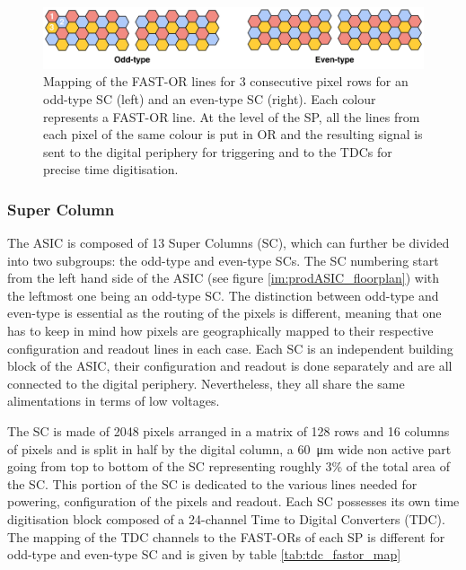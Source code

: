 			\begin{figure}[h]
				\centering
				\includegraphics[width=1.0\textwidth]{files/FastOr_map}
				\caption{Mapping of the FAST-OR lines for 3 consecutive pixel rows for an odd-type SC (left) and an even-type SC (right). Each colour represents a FAST-OR line. At the level of the SP, all the lines from each pixel of the same colour is put in OR and the resulting signal is sent to the digital periphery for triggering and to the TDCs for precise time digitisation.}
				\label{im:FastOR_map}
			\end{figure}
			
			
			\subsubsection{Super Column} 
			The ASIC is composed of 13 Super Columns (SC), which can further be divided into two subgroups: the odd-type and even-type SCs. The SC numbering start from the left hand side of the ASIC (see figure \ref{im:prodASIC_floorplan}) with the leftmost one being an odd-type SC. The distinction between odd-type and even-type is essential as the routing of the pixels is different, meaning that one has to keep in mind how pixels are geographically mapped to their respective configuration and readout lines in each case.  Each SC is an independent building block of the ASIC, their configuration and readout is done separately and are all connected to the digital periphery. Nevertheless, they all share the same alimentations in terms of low voltages. 
				
			The SC is made of 2048 pixels arranged in a matrix of 128 rows and 16 columns of pixels and is split in half by the digital column, a \SI{60}{\micro\meter} wide non active part going from top to bottom of the SC representing roughly 3\% of the total area of the SC. This portion of the SC is dedicated to the various lines needed for powering, configuration of the pixels and readout.
			Each SC possesses its own time digitisation block composed of a 24-channel Time to Digital Converters (TDC). The mapping of the TDC channels to the FAST-ORs of each SP is different for odd-type and even-type SC and is given by table \ref{tab:tdc_fastor_map}
	
